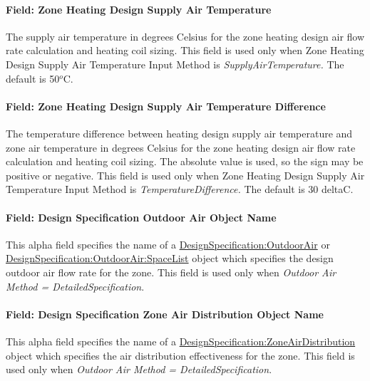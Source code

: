 \paragraph{Field: Zone Heating Design Supply Air Temperature}\label{field-zone-heating-design-supply-air-temperature-000}

The supply air temperature in degrees Celsius for the zone heating design air flow rate calculation and heating coil sizing. This field is used only when Zone Heating Design Supply Air Temperature Input Method is \emph{SupplyAirTemperature.} The default is 50\(^{o}\)C.

\paragraph{Field: Zone Heating Design Supply Air Temperature Difference}\label{field-zone-heating-design-supply-air-temperature-difference-1}

The temperature difference between heating design supply air temperature and zone air temperature in degrees Celsius for the zone heating design air flow rate calculation and heating coil sizing. The absolute value is used, so the sign may be positive or negative. This field is used only when Zone Heating Design Supply Air Temperature Input Method is \emph{TemperatureDifference.} The default is 30 deltaC.

\paragraph{Field: Design Specification Outdoor Air Object Name}\label{field-design-specification-outdoor-air-object-name-3-000}

This alpha field specifies the name of a \hyperref[designspecificationoutdoorair]{DesignSpecification:OutdoorAir} or \hyperref[designspecificationoutdoorairspacelist]{DesignSpecification:OutdoorAir:SpaceList} object which specifies the design outdoor air flow rate for the zone. This field is used only when \emph{Outdoor Air Method = DetailedSpecification}.

\paragraph{Field: Design Specification Zone Air Distribution Object Name}\label{field-design-specification-zone-air-distribution-object-name-2}

This alpha field specifies the name of a \hyperref[designspecificationzoneairdistribution]{DesignSpecification:ZoneAirDistribution} object which specifies the air distribution effectiveness for the zone. This field is used only when \emph{Outdoor Air Method = DetailedSpecification}.

